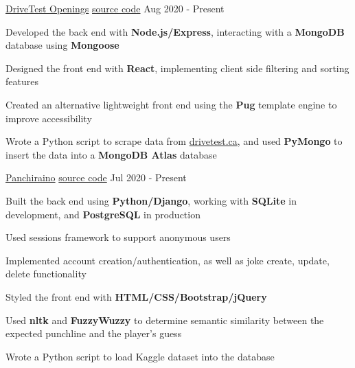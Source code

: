 
\begin{cventries}
  \cventry
    {\fontsize{10pt}{1em}\bodyfont\upshape{}} %
    {\href{http://drivetest-openings.herokuapp.com/}{DriveTest Openings}} %
    {\href{https://github.com/tacticaltofu/drivetest-openings}{source code}} %
    {Aug 2020 - Present} %
    {
      \begin{cvitems} %
        \item {Developed the back end with \textbf{Node.js/Express}, interacting with a \textbf{MongoDB} database using \textbf{Mongoose}}
		\item {Designed the front end with \textbf{React}, implementing client side filtering and sorting features}
		\item {Created an alternative lightweight front end using the \textbf{Pug} template engine to improve accessibility}
		\item{Wrote a Python script to scrape data from \href{https://drivetest.ca/}{drivetest.ca}, and used \textbf{PyMongo} to insert the data into a \textbf{MongoDB Atlas} database}
      \end{cvitems}
    }

  \cventry
    {\fontsize{10pt}{1em}\bodyfont\upshape\color{text}{Web based punchline guessing game}} %
    {\href{http://panchiraino.herokuapp.com/}{Panchiraino}} %
    {\href{https://github.com/tacticaltofu/guesser}{source code}} %
    {Jul 2020 - Present} %
    {
      \begin{cvitems} %
        \item {Built the back end using \textbf{Python/Django}, working with \textbf{SQLite} in development, and \textbf{PostgreSQL} in production}
        \item {Used sessions framework to support anonymous users}
        \item {Implemented account creation/authentication, as well as joke create, update, delete functionality}
        \item {Styled the front end with \textbf{HTML/CSS/Bootstrap/jQuery}}
        \item {Used \textbf{nltk} and \textbf{FuzzyWuzzy} to determine semantic similarity between the expected punchline and the player's guess}
        \item {Wrote a Python script to load Kaggle dataset into the database}
      \end{cvitems}
    }
    

\end{cventries}
